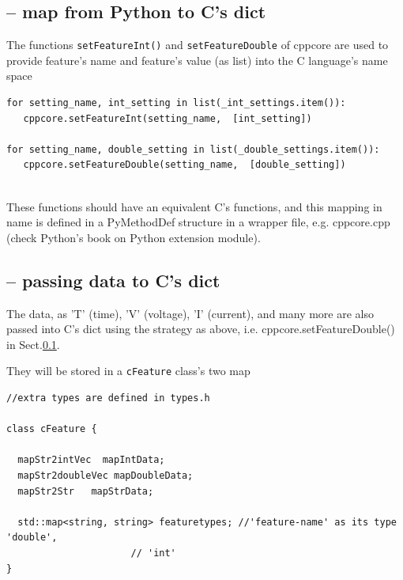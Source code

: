 \subsection{-- map from Python to C's dict}
\label{sec:cppcore-map-Python-data-to-C-internal-data-structure}


The functions \verb!setFeatureInt()! and \verb!setFeatureDouble! of cppcore are
used to provide feature's name and feature's value (as list) into the C
language's name space

\begin{verbatim}
for setting_name, int_setting in list(_int_settings.item()):
   cppcore.setFeatureInt(setting_name,  [int_setting])
   
for setting_name, double_setting in list(_double_settings.item()):
   cppcore.setFeatureDouble(setting_name,  [double_setting])
   
\end{verbatim}

These functions should have an equivalent C's functions, and this mapping in
name is defined in a PyMethodDef structure in a wrapper file, e.g. cppcore.cpp
(check Python's book on Python extension module).

\subsection{-- passing data to C's dict}
\label{sec:efel-pass-data-to-C-cppcore}

The data, as 'T' (time), 'V' (voltage), 'I' (current), and many more are also
passed into C's dict using the strategy as above, i.e.
cppcore.setFeatureDouble() in
Sect.\ref{sec:cppcore-map-Python-data-to-C-internal-data-structure}.

They will be stored in a \verb!cFeature! class's two map
\begin{verbatim}
//extra types are defined in types.h

class cFeature {

  mapStr2intVec  mapIntData;
  mapStr2doubleVec mapDoubleData;
  mapStr2Str   mapStrData;

  std::map<string, string> featuretypes; //'feature-name' as its type 'double', 
                      // 'int'
}
\end{verbatim}

